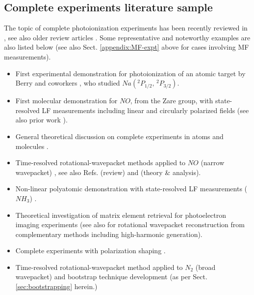 \documentclass[10pt]{article}
\begin{document}
\subsection{Complete experiments literature sample\label{sec:CompleteLit}}


The topic of complete photoionization experiments has been recently reviewed in \cite{kleinpoppen2013perfect, hockett2018QMP2}, see also older review articles \cite{Becker1998,Reid2003,Kleinpoppen2005}. Some representative and noteworthy examples are also listed below (see also Sect. \ref{appendix:MF-expt} above for cases involving MF measurements).

\begin{itemize}
\item First experimental demonstration for photoionization of an atomic target by Berry and coworkers \cite{Duncanson1976}, who studied
$Na(^{2}P_{1/2},\,^{2}P_{3/2})$.
\item First molecular demonstration for $NO$, from the Zare group, with state-resolved LF measurements including linear and circularly polarized fields \cite{Reid1992} (see also prior work \cite{Allendorf1989,Leahy1991,Reid1991}).
\item General theoretical discussion on complete experiments in atoms and molecules \cite{Cherepkov2005}.
\item Time-resolved rotational-wavepacket methods applied to $NO$ (narrow wavepacket) \cite{Tsubouchi2004, Tang2010}, see also Refs. \cite{Suzuki2006} (review) and \cite{Suzuki2007} (theory \& analysis).
\item Non-linear polyatomic demonstration with state-resolved LF measurements ($NH_3$) \cite{hockett2009RotationallyResolvedPhotoelectron}.
\item Theoretical investigation of matrix element retrieval for photoelectron imaging experiments \cite{Ramakrishna2012} (see also \cite{Ramakrishna2013} for rotational wavepacket reconstruction from complementary methods including high-harmonic generation).  
\item Complete experiments with polarization shaping \cite{hockett2014CompletePhotoionizationExperiments, hockett2015CompletePhotoionizationExperiments}.
\item Time-resolved rotational-wavepacket method applied to $N_2$ (broad wavepacket) and bootstrap technique development \cite{marceau2017MolecularFrameReconstruction} (as per Sect. \ref{sec:bootstrapping} herein.)
\end{itemize} 
\end{document}
